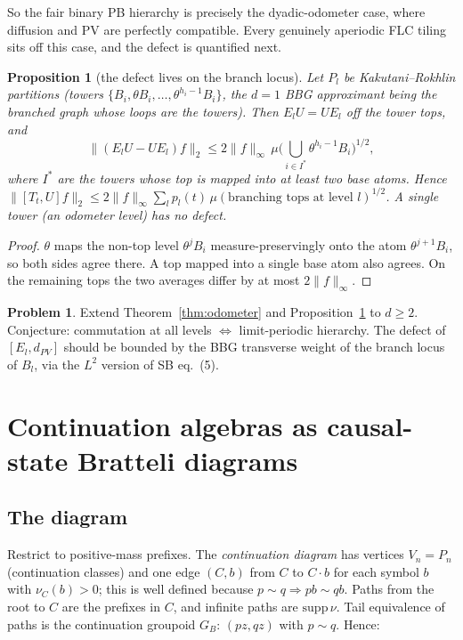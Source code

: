 \documentclass[11pt]{article}
\newtheorem{proposition}[theorem]{Proposition}
\theoremstyle{definition}
\newtheorem{problem}[theorem]{Problem}
\theoremstyle{remark}
\begin{document}
So the fair binary PB hierarchy is precisely the dyadic-odometer case, where diffusion and PV are perfectly compatible. Every genuinely aperiodic FLC tiling sits off this case, and the defect is quantified next.

\begin{proposition}[the defect lives on the branch locus]\label{prop:kr}
Let $P_l$ be Kakutani--Rokhlin partitions (towers $\{B_i,\theta B_i,\dots,\theta^{h_i-1}B_i\}$, the $d=1$ BBG approximant being the branched graph whose loops are the towers). Then $E_lU=UE_l$ off the tower tops, and
\[\|(E_lU-UE_l)f\|_2\le2\|f\|_\infty\,\mu\Big(\bigcup_{i\in I^*}\theta^{h_i-1}B_i\Big)^{1/2},\]
where $I^*$ are the towers whose top is mapped into at least two base atoms. Hence $\|[T_t,U]f\|_2\le2\|f\|_\infty\sum_lp_l(t)\,\mu(\text{branching tops at level }l)^{1/2}$. A single tower (an odometer level) has no defect.
\end{proposition}

\begin{proof}
$\theta$ maps the non-top level $\theta^jB_i$ measure-preservingly onto the atom $\theta^{j+1}B_i$, so both sides agree there. A top mapped into a single base atom also agrees. On the remaining tops the two averages differ by at most $2\|f\|_\infty$.
\end{proof}

\begin{problem}
Extend Theorem~\ref{thm:odometer} and Proposition~\ref{prop:kr} to $d\ge2$. Conjecture: commutation at all levels $\iff$ limit-periodic hierarchy. The defect of $[E_l,d_{PV}]$ should be bounded by the BBG transverse weight of the branch locus of $B_l$, via the $L^2$ version of SB eq.~(5).
\end{problem}

\section{Continuation algebras as causal-state Bratteli diagrams}\label{sec:causal}

\subsection{The diagram}
Restrict to positive-mass prefixes. The \emph{continuation diagram} has vertices $V_n=P_n$ (continuation classes) and one edge $(C,b)$ from $C$ to $C\cdot b$ for each symbol $b$ with $\nu_C(b)>0$; this is well defined because $p\sim q\Rightarrow pb\sim qb$. Paths from the root to $C$ are the prefixes in $C$, and infinite paths are $\mathrm{supp}\,\nu$. Tail equivalence of paths is the continuation groupoid $G_B$: $(pz,qz)$ with $p\sim q$. Hence:
\end{document}
